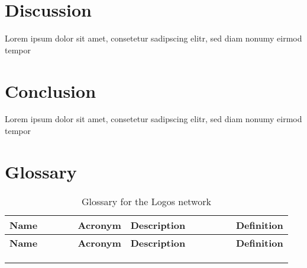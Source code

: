 \documentclass[]{article}
\begin{document}
\section{Discussion}
Lorem ipsum dolor sit amet, consetetur sadipscing elitr, sed diam nonumy eirmod tempor 

\section{Conclusion}
Lorem ipsum dolor sit amet, consetetur sadipscing elitr, sed diam nonumy eirmod tempor 

\newpage
\printbibliography %
\newpage

\newpage
\section*{Glossary}
\begin{longtable}{p{0.3\linewidth} p{0.1\linewidth} p{0.45\linewidth} p{0.1\linewidth}}
	\textbf{Name}&\textbf{Acronym}&\textbf{Description}&\textbf{Definition}\newline \\ \hline
	\endfirsthead
	\textbf{Name}&\textbf{Acronym}&\textbf{Description}&\textbf{Definition}\newline \\ \hline
	\endhead

 &  &  &   \\ %
 &  &  &   \\ %

	\caption{Glossary for the Logos network}
\end{longtable}
\end{document}
